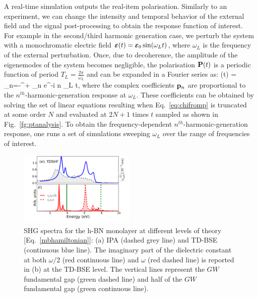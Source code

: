 A real-time simulation outputs the real-item polarisation. Similarly to an experiment, we can change the intensity and temporal behavior of the external field and the signal post-processing to obtain the response function of interest.      
For example in the second/third harmonic generation case, we perturb the system with a monochromatic electric field $\boldsymbol{\scriptstyle \cal E}(t) = \boldsymbol{\scriptstyle \cal E}_0 \sin(\omega_L t)$, where $\omega_L$ is the frequency of the external perturbation. Once, due to decoherence, the amplitude of the eigenemodes of the system becomes negligible, the polarisation ${\bf P}(t)$ is a periodic function of period $T_L =\frac{2\pi}{\omega_L}$ and can be expanded in a Fourier series as:
\be
\PP(t) = \sum_{n=-\infty}^{+\infty} \pp_n e^{-i n \omega_L t}, 
\label{eq:chifromp}
\ee
 where the complex coefficients ${\bf p}_n$ are proportional to the $n^{th}$-harmonic-generation response at $\omega_L$. These coefficients can be obtained by solving the set of linear equations resulting when Eq.~\ref{eq:chifromp} is truncated at some order $N$ and evaluated at $2N+1$ times $t$ sampled as shown in Fig.~\ref{fg:ptanalysis}.  %
To obtain the frequency-dependent  $n^{th}$-harmonic-generation response, one runs a set of simulations sweeping $\omega_L$ over the range of frequencies of interest. 
 
\begin{figure}
    \centering
\includegraphics[width=0.5\textwidth]{Figures/eps_and_X2_short}
	\caption{\footnotesize{SHG spectra for the h-BN monolayer at different levels of theory [Eq.~\eqref{mbhamiltonian}]: (a) IPA (dashed grey line) and TD-BSE (continuous blue line). The imaginary part of the dielectric constant at both $\omega/2$ (red continuous line) and $\omega$ (red dashed line) is reported in (b) at the  TD-BSE level. The vertical lines represent the $GW$ fundamental gap (green dashed line) and half of the $GW$ fundamental gap (green continuous line). \label{X2bn} }}
\end{figure}

